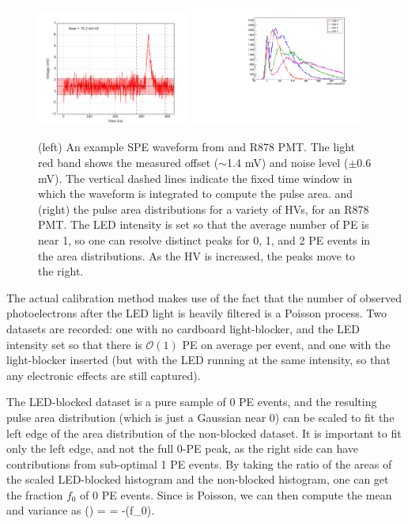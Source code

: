 {\begin{figure}[t]
  \begin{center}
    \includegraphics[width=0.450\textwidth]{figs/milliq/example_led_event_878.png}
    \includegraphics[width=0.500\textwidth]{figs/milliq/pmt_areas_hv_scan.pdf}
    \caption{(left) An example SPE waveform from and R878 PMT. The light red
      band shows the measured offset ($\sim$1.4 mV) and noise level ($\pm$0.6 mV).
      The vertical dashed lines indicate the fixed time window in which the 
      waveform is integrated to compute the pulse area.
      and (right) the pulse area distributions
      for a variety of HVs, for an R878 PMT. The LED intensity is set so that
      the average number of PE is near 1, so one can resolve distinct peaks for
      0, 1, and 2 PE events in the area distributions. As the HV is increased, the peaks
      move to the right.
            }
    \label{fig:led_events}
  \end{center}
\end{figure}

The actual calibration method makes use of the fact that the number of observed photoelectrons
after the LED light is heavily filtered is a Poisson process. Two datasets are recorded:
one with no cardboard light-blocker, and the LED intensity set so that there
is $\mathcal{O}(1)$ PE on average per event, and one with the light-blocker inserted
(but with the LED running at the same intensity, so that any electronic effects
are still captured).

The LED-blocked dataset is a pure sample of 0 PE events, and the resulting pulse area distribution
(which is just a Gaussian near 0) can be scaled to fit the left edge of the area distribution
of the non-blocked dataset. It is important to fit only the left edge, and not the full 0-PE peak,
as the right side can have contributions from sub-optimal 1 PE events. By taking the ratio
of the areas of the scaled LED-blocked histogram and the non-blocked histogram, one can get
the fraction $f_0$ of 0 PE events. Since \Npe is Poisson, we can then compute the
mean and variance as
\be
{}(\Npe) = \langle \Npe\rangle = -\log(f_0).
\ee

}
